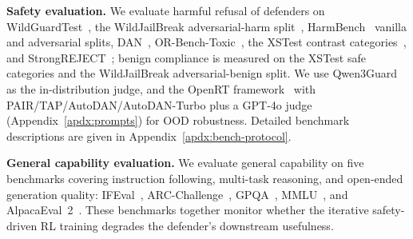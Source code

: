 \documentclass{article}
\begin{document}
\textbf{Safety evaluation.}\quad
We evaluate harmful refusal of defenders on WildGuardTest~\citep{han2024wildguard}, the WildJailBreak adversarial-harm split~\citep{jiang2024wildteaming}, HarmBench~\citep{mazeika2024harmbench} vanilla and adversarial splits, DAN~\citep{shen2023doanythingnow}, OR-Bench-Toxic~\citep{cui2024orbench}, the XSTest contrast categories~\citep{rottger2023xstest}, and StrongREJECT~\citep{souly2024strongreject}; benign compliance is measured on the XSTest safe categories and the WildJailBreak adversarial-benign split. We use Qwen3Guard~\citep{zhao2025qwen3guard} as the in-distribution judge, and the OpenRT framework~\citep{OpenRT2026} with PAIR/TAP/AutoDAN/AutoDAN-Turbo plus a GPT-4o judge (Appendix~\ref{apdx:prompts}) for OOD robustness. Detailed benchmark descriptions are given in Appendix~\ref{apdx:bench-protocol}.

\textbf{General capability evaluation.}\quad
We evaluate general capability on five benchmarks covering instruction following, multi-task reasoning, and open-ended generation quality: IFEval~\citep{zhou2023ifeval}, ARC-Challenge~\citep{clark2018arc}, GPQA~\citep{rein2023gpqa}, MMLU~\citep{hendrycks2021mmlu}, and AlpacaEval~2~\citep{dubois2024alpacaeval2}. These benchmarks together monitor whether the iterative safety-driven RL training degrades the defender's downstream usefulness.
\end{document}
